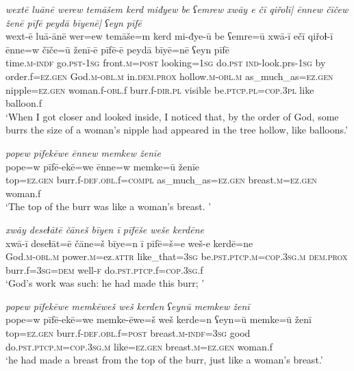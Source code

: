 \ea \label{ZQ.39}
\textit{wextē luānē werew temāšem kerd miđyew be ʕemrew xwāy e čī qiřolī| ēnnew čīčew ženē pīfē peydā bīyenē| ʕeyn pīfē} \\ 
\gll wext-ē luā-ānē wer=ew temāše=m kerd mi-đye-ū be ʕemre=ū xwā-ī ečī qiřoɫ-ī ēnne=w čīče=ū ženī-ē pīfē-ē peydā bīyē=nē ʕeyn pīfē \\ 
 time\textsc{.m}\textsc{-indf} go\textsc{.pst}\textsc{-\textsc{1sg}} front\textsc{.m}\textsc{=\textsc{post}} looking\textsc{=\textsc{1sg}} do\textsc{.pst} \textsc{ind-}look.prs\textsc{-\textsc{1sg}} by order.f\textsc{=ez.gen} God\textsc{.m}\textsc{-obl}\textsc{.m} in.\textsc{dem.prox} hollow\textsc{.m}\textsc{-obl}\textsc{.m} as\_much\_as\textsc{=ez.gen} nipple\textsc{=ez.gen} woman.f\textsc{-obl}.f burr.f\textsc{-dir}\textsc{.pl} visible be\textsc{.ptcp}\textsc{.pl}\textsc{=cop}\textsc{.3pl} like balloon.f \\ 
\glt `When I got closer and looked inside, I noticed that, by the order of God, some burrs the size of a woman's nipple had appeared in the tree hollow, like balloons.'
\z 
 
\ea \label{ZQ.40}
\textit{popew pīfekēwe ēnnew memkew ženīe} \\ 
\gll pope=w pīfē-ekē=we ēnne=w memke=ū ženīe \\ 
 top\textsc{=ez.gen} burr.f\textsc{-def}\textsc{.obl}.f\textsc{=compl} as\_much\_as\textsc{=ez.gen} breast\textsc{.m}\textsc{=ez.gen} woman.f \\ 
\glt `The top of the burr was like a woman’s breast. '
\z 
 
\ea \label{ZQ.42}
\textit{xwāy deseɫātē čāneš bīyen ī pīfēše weše kerdēne} \\ 
\gll xwā-ī deseɫāt=ē čāne=š bīye=n ī pīfē=š=e weš-e kerdē=ne \\ 
 God\textsc{.m}\textsc{-obl}\textsc{.m} power\textsc{.m}=ez.\textsc{attr} like\_that\textsc{=3sg} be\textsc{.pst}\textsc{.ptcp}\textsc{.m}\textsc{=cop}\textsc{.3sg}\textsc{.m} \textsc{dem.prox} burr.f\textsc{=3sg}\textsc{=dem} well\textsc{-f} do\textsc{.pst}\textsc{.ptcp}.f\textsc{=cop}\textsc{.3sg}.f \\ 
\glt `God’s work was such: he had made this burr; '
\z 
 
\ea \label{ZQ.43}
\textit{popew pīfekēwe memkēweš weš kerden ʕeynū memkew ženī} \\ 
\gll pope=w pīfē-ekē=we memke-ēwe=š weš kerde=n ʕeyn=ū memke=ū ženī \\ 
 top\textsc{=ez.gen} burr.f\textsc{-def}\textsc{.obl}.f\textsc{=\textsc{post}} breast\textsc{.m}\textsc{-indf}\textsc{=3sg} good do\textsc{.pst}\textsc{.ptcp}\textsc{.m}\textsc{=cop}\textsc{.3sg}\textsc{.m} like\textsc{=ez.gen} breast\textsc{.m}\textsc{=ez.gen} woman.f \\ 
\glt `he had made a breast from the top of the burr, just like a woman’s breast.'
\z 
 
